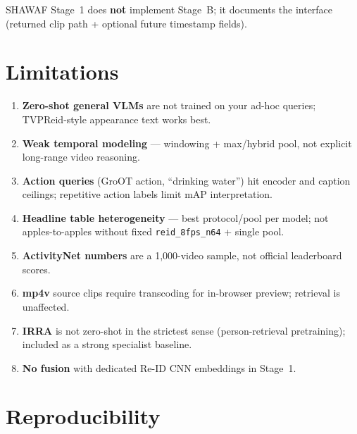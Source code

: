 \documentclass[11pt,a4paper]{article}
\begin{document}
SHAWAF Stage~1 does \textbf{not} implement Stage~B; it documents the interface (returned clip path + optional future timestamp fields).

\section{Limitations}

\label{sec:limitations}

\begin{enumerate}
  \item \textbf{Zero-shot general VLMs} are not trained on your ad-hoc queries; TVPReid-style appearance text works best.
  \item \textbf{Weak temporal modeling} --- windowing + max/hybrid pool, not explicit long-range video reasoning.
  \item \textbf{Action queries} (GroOT action, ``drinking water'') hit encoder and caption ceilings; repetitive action labels limit mAP interpretation.
  \item \textbf{Headline table heterogeneity} --- best protocol/pool per model; not apples-to-apples without fixed \texttt{reid\_8fps\_n64} + single pool.
  \item \textbf{ActivityNet numbers} are a 1{,}000-video sample, not official leaderboard scores.
  \item \textbf{mp4v} source clips require transcoding for in-browser preview; retrieval is unaffected.
  \item \textbf{IRRA} is not zero-shot in the strictest sense (person-retrieval pretraining); included as a strong specialist baseline.
  \item \textbf{No fusion} with dedicated Re-ID CNN embeddings in Stage~1.
\end{enumerate}

\section{Reproducibility}
\end{document}
